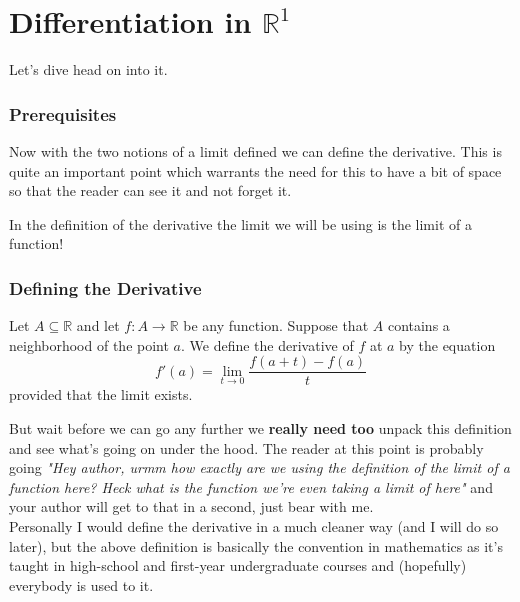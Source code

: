 
	\chapter{Differentiation in $\mathbb{R}^1$}
	Let's dive head on into it.
	\subsection{Prerequisites}
	
	
	Now with the two notions of a limit defined we can define the derivative. This is quite an important point which warrants the need for this to have a bit of space so that the reader can see it and not forget it.
	\medskip
	\begin{point}
		In the definition of the derivative the limit we will be using is the limit of a function!
	\end{point}
	
	
	
	\subsection{Defining the Derivative}
	
	
	\begin{definition}
		Let $A \subseteq \mathbb{R}$ and let $f : A \to \mathbb{R}$ be any function. Suppose that $A$ contains a neighborhood of the point $a$. We define the derivative of $f$ at $a$ by the equation $$f'(a) = \lim_{t \to 0} \frac{f(a+t) - f(a)}{t}$$ provided that the limit exists.
	\end{definition}
	
	But wait before we can go any further we \textbf{really need too} unpack this definition and see what's going on under the hood. The reader at this point is probably going \textit{"Hey author, urmm how exactly are we using the definition of the limit of a function here? Heck what is the function we're even taking a limit of here"} and your author will get to that in a second, just bear with me. \\
		
	Personally I would define the derivative in a much cleaner way (and I will do so later), but the above definition is basically the convention in mathematics as it's taught in high-school and first-year undergraduate courses and (hopefully) everybody is used to it. \\
		
